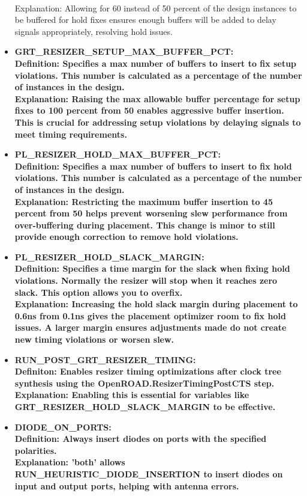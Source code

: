 \documentclass{article}
\begin{document}
\begin{flushleft}
\begin{itemize}
\\Explanation: Allowing for 60 instead of 50 percent of the design instances to be buffered for hold fixes ensures enough buffers will be added to delay signals appropriately, resolving hold issues.
\item \bf{GRT\_RESIZER\_SETUP\_MAX\_BUFFER\_PCT:}
\\Definition: Specifies a max number of buffers to insert to fix setup violations. This number is calculated as a percentage of the number of instances in the design.
\\Explanation: Raising the max allowable buffer percentage for setup fixes to 100 percent from 50 enables aggressive buffer insertion. This is crucial for addressing setup violations by delaying signals to meet timing requirements.
\item \bf{PL\_RESIZER\_HOLD\_MAX\_BUFFER\_PCT:}
\\Definition: Specifies a max number of buffers to insert to fix hold violations. This number is calculated as a percentage of the number of instances in the design.
\\Explanation: Restricting the maximum buffer insertion to 45 percent from 50 helps prevent worsening slew performance from over-buffering during placement. This change is minor to still provide enough correction to remove hold violations.
\item \bf{PL\_RESIZER\_HOLD\_SLACK\_MARGIN:}
\\Definition: Specifies a time margin for the slack when fixing hold violations. Normally the resizer will stop when it reaches zero slack. This option allows you to overfix.
\\Explanation: Increasing the hold slack margin during placement to 0.6ns from 0.1ns gives the placement optimizer room to fix hold issues. A larger margin ensures adjustments made do not create new timing violations or worsen slew.
\item \bf{RUN\_POST\_GRT\_RESIZER\_TIMING:}
\\Definiton: Enables resizer timing optimizations after clock tree synthesis using the OpenROAD.ResizerTimingPostCTS step.
\\Explanation: Enabling this is essential for variables like
\\GRT\_RESIZER\_HOLD\_SLACK\_MARGIN to be effective.
\item \bf{DIODE\_ON\_PORTS:}
\\Definition: Always insert diodes on ports with the specified polarities.
\\Explanation: 'both' allows RUN\_HEURISTIC\_DIODE\_INSERTION to insert diodes on input and output ports, helping with antenna errors.

\end{itemize}
\end{flushleft}
\end{document}
